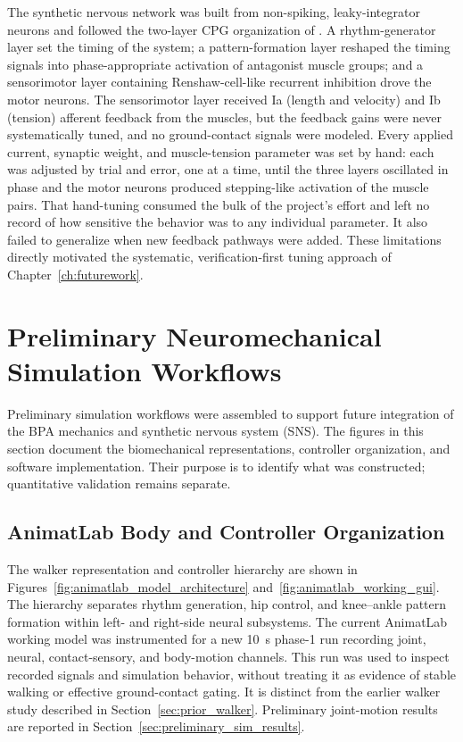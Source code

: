 The synthetic nervous network was built from non-spiking, leaky-integrator neurons and followed the two-layer CPG organization of \citet{deng_neuromechanical_2019}. A rhythm-generator layer set the timing of the system; a pattern-formation layer reshaped the timing signals into phase-appropriate activation of antagonist muscle groups; and a sensorimotor layer containing Renshaw-cell-like recurrent inhibition drove the motor neurons. The sensorimotor layer received Ia (length and velocity) and Ib (tension) afferent feedback from the muscles, but the feedback gains were never systematically tuned, and no ground-contact signals were modeled. Every applied current, synaptic weight, and muscle-tension parameter was set by hand: each was adjusted by trial and error, one at a time, until the three layers oscillated in phase and the motor neurons produced stepping-like activation of the muscle pairs. That hand-tuning consumed the bulk of the project's effort and left no record of how sensitive the behavior was to any individual parameter. It also failed to generalize when new feedback pathways were added. These limitations directly motivated the systematic, verification-first tuning approach of Chapter~\ref{ch:futurework}.

\section{Preliminary Neuromechanical Simulation Workflows}\label{sec:preliminary_sim_methods}

Preliminary simulation workflows were assembled to support future integration of the BPA mechanics and synthetic nervous system (SNS). The figures in this section document the biomechanical representations, controller organization, and software implementation. Their purpose is to identify what was constructed; quantitative validation remains separate.

\subsection{AnimatLab Body and Controller Organization}

The walker representation and controller hierarchy are shown in Figures~\ref{fig:animatlab_model_architecture} and~\ref{fig:animatlab_working_gui}. The hierarchy separates rhythm generation, hip control, and knee--ankle pattern formation within left- and right-side neural subsystems. The current AnimatLab working model was instrumented for a new \qty{10}{\second} phase-1 run recording joint, neural, contact-sensory, and body-motion channels. This run was used to inspect recorded signals and simulation behavior, without treating it as evidence of stable walking or effective ground-contact gating. It is distinct from the earlier walker study described in Section~\ref{sec:prior_walker}. Preliminary joint-motion results are reported in Section~\ref{sec:preliminary_sim_results}.

